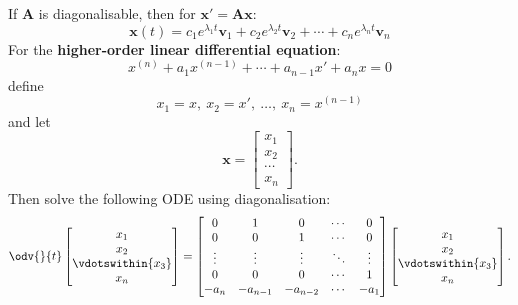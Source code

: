 \documentclass{article}
\begin{document}
\begin{multicols*}{2}
    If \(\symbf{A}\) is diagonalisable, then for \(\symbf{x}' = \symbf{A} \symbf{x}\):
    \begin{equation*}
        \symbf{x}(t) = c_1 e^{\lambda_1 t} \symbf{v}_1 + c_2 e^{\lambda_2 t} \symbf{v}_2 + \cdots + c_n e^{\lambda_n t} \symbf{v}_n
    \end{equation*}
    For the \textbf{higher-order linear differential equation}:
    \begin{equation*}
        x^{\left( n \right)} + a_1 x^{\left( n-1 \right)} + \cdots + a_{n-1} x' + a_n x = 0
    \end{equation*}
    define
    \begin{equation*}
        x_1 = x,\: x_2 = x',\: \dots,\: x_n = x^{\left( n-1 \right)}
    \end{equation*}
    and let
    \begin{equation*}
        \symbf{x}=
        \begin{bmatrix}
            x_1 \\ x_2 \\ \cdots \\ x_n
        \end{bmatrix}.
    \end{equation*}
    Then solve the following ODE using diagonalisation:
    \begin{equation*}
        \odv{}{t}
        \begin{bmatrix}
            x_1               \\
            x_2               \\
            \vdotswithin{x_3} \\
            x_n
        \end{bmatrix}
        =
        \begin{bmatrix}
            0      & 1        & 0        & \cdots & 0      \\
            0      & 0        & 1        & \cdots & 0      \\
            \vdots & \vdots   & \vdots   & \ddots & \vdots \\
            0      & 0        & 0        & \cdots & 1      \\
            -a_n   & -a_{n-1} & -a_{n-2} & \cdots & -a_1
        \end{bmatrix}
        \begin{bmatrix}
            x_1               \\
            x_2               \\
            \vdotswithin{x_3} \\
            x_n
        \end{bmatrix}.
    \end{equation*}

\end{multicols*}
\end{document}
